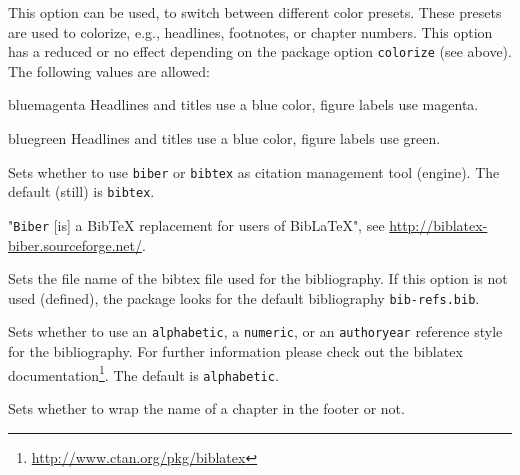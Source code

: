 \documentclass{ltxdockit}
\begin{document}
\begin{optionlist}

This option can be used, to switch between different color presets.
These presets are used to colorize, e.g., headlines, footnotes, or chapter numbers.
This option has a reduced or no effect depending on the package option \texttt{colorize} (see above).
The following values are allowed:

\begin{valuelist}
\item[bluemagenta] Headlines and titles use a blue color, figure labels use magenta.
\item[bluegreen] Headlines and titles use a blue color, figure labels use green.
\end{valuelist}


Sets whether to use \texttt{biber} or \texttt{bibtex} as citation management tool (engine).
The default (still) is \texttt{bibtex}.

"\texttt{Biber} [is] a BibTeX replacement for users of BibLaTeX", see \url{http://biblatex-biber.sourceforge.net/}.


Sets the file name of the bibtex file used for the bibliography.
If this option is not used (defined), the package looks for the default bibliography \texttt{bib-refs.bib}.


Sets whether to use an \texttt{alphabetic}, a \texttt{numeric}, or an \texttt{authoryear} reference style for the bibliography.
For further information please check out the biblatex documentation\footnote{\url{http://www.ctan.org/pkg/biblatex}}.
The default is \texttt{alphabetic}.


Sets whether to wrap the name of a chapter in the footer or not.

\end{optionlist}
\end{document}
